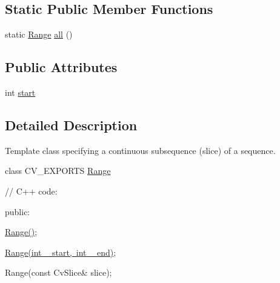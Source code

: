 \subsection*{Static Public Member Functions}
\begin{DoxyCompactItemize}
\item 
static \mbox{\hyperlink{classorg_1_1opencv_1_1core_1_1_range}{Range}} \mbox{\hyperlink{classorg_1_1opencv_1_1core_1_1_range_a2dd4a07a9715665aacee5c7cdf79a175}{all}} ()
\end{DoxyCompactItemize}
\subsection*{Public Attributes}
\begin{DoxyCompactItemize}
\item 
int \mbox{\hyperlink{classorg_1_1opencv_1_1core_1_1_range_a6229f6093afc24bfa44c18a8ccfdbcb4}{start}}
\end{DoxyCompactItemize}


\subsection{Detailed Description}
Template class specifying a continuous subsequence (slice) of a sequence.

class C\+V\+\_\+\+E\+X\+P\+O\+R\+TS \mbox{\hyperlink{classorg_1_1opencv_1_1core_1_1_range}{Range}} {\ttfamily }

{\ttfamily }

{\ttfamily }

{\ttfamily // C++ code\+:}

{\ttfamily }

{\ttfamily }

{\ttfamily public\+:}

{\ttfamily }

{\ttfamily }

{\ttfamily \mbox{\hyperlink{classorg_1_1opencv_1_1core_1_1_range_a9f31905b8ce03ab215e5a9fbefb69fb0}{Range()}};}

{\ttfamily }

{\ttfamily }

{\ttfamily \mbox{\hyperlink{classorg_1_1opencv_1_1core_1_1_range_a1089f14e7fa40016a6cbd17991c2dae4}{Range(int \+\_\+start, int \+\_\+end)}};}

{\ttfamily }

{\ttfamily }

{\ttfamily Range(const Cv\+Slice\& slice);}

